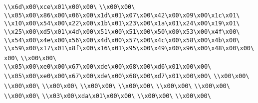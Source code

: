 \verb|\\x6d\x00\xce\x01\x00\x00\|\newline
\verb|\\x00\x00\|\newline
\verb|\\x05\x00\x86\x00\x06\x00\x1d\x01\x07\x00\x42\x00\x09\x00\x1c\x01\|\newline
\verb|\\x10\x00\x54\x00\x22\x00\x1b\x01\x23\x00\x1a\x01\x24\x00\x19\x01\|\newline
\verb|\\x25\x00\xd5\x01\x4d\x00\x51\x00\x51\x00\x50\x00\x53\x00\x4f\x00\|\newline
\verb|\\x54\x00\x4e\x00\x56\x00\x4d\x00\x57\x00\x4c\x00\x58\x00\x4b\x00\|\newline
\verb|\\x59\x00\x17\x01\x8f\x00\x16\x01\x95\x00\x49\x00\x96\x00\x48\x00\x00\x00\|\newline
\verb|\\x00\x00\|\newline
\verb|\\x05\x00\xe0\x00\x67\x00\xde\x00\x68\x00\xd6\x01\x00\x00\|\newline
\verb|\\x05\x00\xe0\x00\x67\x00\xde\x00\x68\x00\xd7\x01\x00\x00\|\newline
\verb|\\x00\x00\|\newline
\verb|\\x00\x00\|\newline
\verb|\\x00\x00\|\newline
\verb|\\x00\x00\|\newline
\verb|\\x00\x00\|\newline
\verb|\\x00\x00\|\newline
\verb|\\x00\x00\|\newline
\verb|\\x00\x00\|\newline
\verb|\\x03\x00\xda\x01\x00\x00\|\newline
\verb|\\x00\x00\|\newline
\verb|\\x00\x00\|\newline
